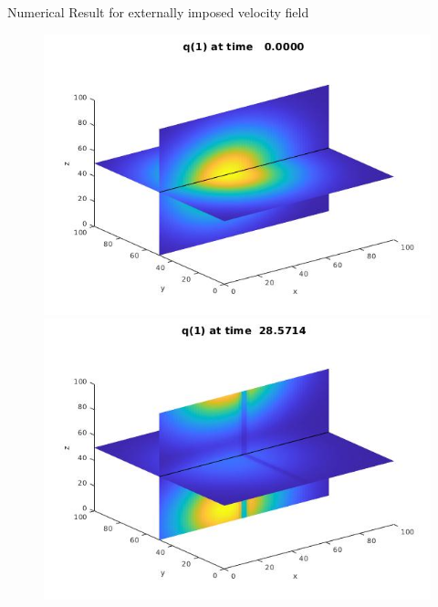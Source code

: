 \begin{frame}{Numerical Result for externally imposed velocity field}
    	\begin{figure}[H]
    		\centering
    		\begin{minipage}{0.32\textwidth}
    			\includegraphics[width=\linewidth]{Bilder_3D/1Glocke_wxi=wyj=1_wzk=0_2Cluster_t=0}
    		\end{minipage}
    		\hfill 
    		\begin{minipage}{0.32\textwidth}
    			\includegraphics[width=\linewidth]{Bilder_3D/1Glocke_wxi=wyj=1_wzk=0_2Cluster_t=28}
    		\end{minipage}
    		\hfill 
    		\begin{minipage}{0.32\textwidth}

\end{minipage}
\end{figure}
\end{frame}
